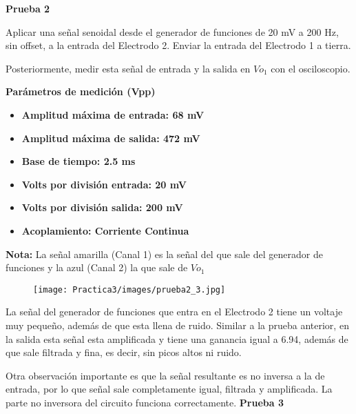 \documentclass[12pt]{article}
\begin{document}
	\newpage
	\textbf{Prueba 2}
	
	Aplicar una señal senoidal desde el generador de funciones de 20 mV a 200 Hz, sin offset, a la entrada del Electrodo 2. Enviar la entrada del Electrodo 1 a tierra.
	
	Posteriormente, medir esta señal de entrada y la salida en $Vo_{1}$ con el osciloscopio.
	
	\textbf{Parámetros de medición (Vpp)}
            \begin{multicols}{2}
                \begin{itemize}
                    \item[\checkmark] \textbf{Amplitud máxima de entrada: 68 mV}
                    \item[\checkmark] \textbf{Amplitud máxima de salida: 472 mV}
                    \item[\checkmark] \textbf{Base de tiempo: 2.5 ms}
            \columnbreak
                    \item[\checkmark] \textbf{Volts por división entrada: 20 mV}
                    \item[\checkmark] \textbf{Volts por división salida: 200 mV}
                    \item[\checkmark] \textbf{Acoplamiento: Corriente Continua}
                \end{itemize}
            \end{multicols}
            
            \textbf{Nota:} La señal amarilla (Canal 1) es la señal del que sale del generador de funciones y la azul (Canal 2) la que sale de $Vo_{1}$
            
	        \begin{figure}[h!]
                \centering
                \texttt{[image: Practica3/images/prueba2\_3.jpg]}
            \end{figure} 
            
            La señal del generador de funciones que entra en el Electrodo 2 tiene un voltaje muy pequeño, además de que esta llena de ruido. Similar a la prueba anterior, en la salida esta señal esta amplificada y tiene una ganancia igual a 6.94, además de que sale filtrada y fina, es decir, sin picos altos ni ruido.
            
            Otra observación importante es que la señal resultante es no inversa a la de entrada, por lo que señal sale completamente igual, filtrada y amplificada. La parte no inversora del circuito funciona correctamente.
	\newpage
	\textbf{Prueba 3}
	
\end{document}
